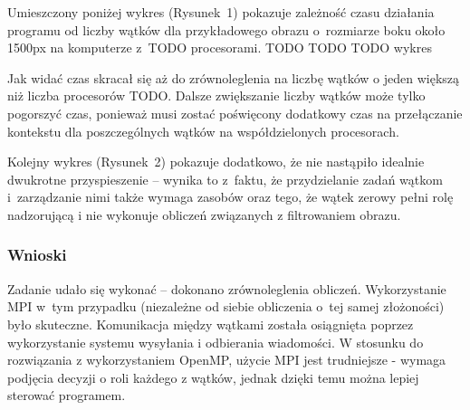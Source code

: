 \documentclass[a4paper,12pt]{article}
\begin{document}
Umieszczony poniżej wykres (Rysunek~1) pokazuje zależność czasu działania programu od liczby wątków dla przykładowego obrazu o~rozmiarze boku około 1500px na komputerze z~TODO procesorami.
TODO TODO TODO wykres


Jak widać czas skracał się aż do zrównoleglenia na liczbę wątków o jeden większą niż  liczba procesorów TODO. Dalsze zwiększanie liczby wątków może tylko pogorszyć czas, ponieważ musi zostać poświęcony dodatkowy czas na przełączanie kontekstu dla poszczególnych wątków na współdzielonych procesorach.

Kolejny wykres (Rysunek~2) pokazuje dodatkowo, że nie nastąpiło idealnie dwukrotne przyspieszenie -- wynika to z~faktu, że przydzielanie zadań wątkom i~zarządzanie nimi także wymaga zasobów oraz tego, że wątek zerowy pełni rolę nadzorującą i nie wykonuje obliczeń związanych z filtrowaniem obrazu.


\subsubsection*{Wnioski }
Zadanie udało się wykonać -- dokonano zrównoleglenia obliczeń. Wykorzystanie MPI w~tym przypadku (niezależne od siebie obliczenia o~tej samej złożoności) było skuteczne. Komunikacja między wątkami została osiągnięta poprzez wykorzystanie systemu wysyłania i odbierania wiadomości. W stosunku do rozwiązania z wykorzystaniem OpenMP, użycie MPI jest trudniejsze - wymaga podjęcia decyzji o roli każdego z wątków, jednak dzięki temu można lepiej sterować programem.
\end{document}
